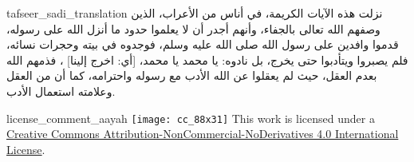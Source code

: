 \begin{taggedblock}{tafseer_sadi_translation}
نزلت هذه الآيات الكريمة، في أناس من الأعراب، الذين وصفهم الله تعالى بالجفاء، وأنهم أجدر أن لا يعلموا حدود ما أنزل الله على رسوله، قدموا وافدين على رسول الله صلى الله عليه وسلم، فوجدوه في بيته وحجرات نسائه، فلم يصبروا ويتأدبوا حتى يخرج، بل نادوه: يا محمد يا محمد،
[أي: اخرج إلينا]
، فذمهم الله بعدم العقل، حيث لم يعقلوا عن الله الأدب مع رسوله واحترامه، كما أن من العقل وعلامته استعمال الأدب.
\end{taggedblock}
\begin{taggedblock}{license_comment_aayah}
\texttt{[image: cc\_88x31]}
This work is licensed under a 
\href{http://creativecommons.org/licenses/by-nc-nd/4.0/}{Creative Commons Attribution-NonCommercial-NoDerivatives 4.0 International License}.
\end{taggedblock}
\begin{comment}
Please use the following for footnotes:- Sample\footnoteQ{Text of Qur'an footnote goes here.}.
Sample\footnoteT{Text of Tafseer footnote goes here.}.
\end{comment}